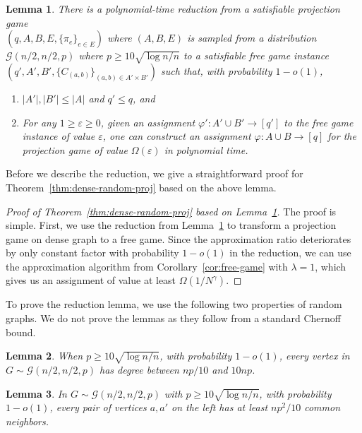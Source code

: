 \documentclass{article}
\newtheorem{lemma}{Lemma}
\begin{document}
\begin{lemma} \label{lem:reduction-dense}
There is a polynomial-time reduction from a satisfiable projection game \\ $(q, A, B, E, \{\pi_e\}_{e \in E})$ where $(A, B, E)$ is sampled from a distribution $\mathcal{G}(n/2, n/2, p)$ where $p \geq 10\sqrt{\log n / n}$ to a satisfiable free game instance $(q', A', B', \{C_{(a, b)}\}_{(a, b) \in A' \times B'})$ such that, with probability $1 - o(1)$,
\begin{enumerate} \itemsep0em
  \item $|A'|, |B'| \leq |A|$ and $q' \leq q$, and
  \item For any $1 \geq \varepsilon \geq 0$, given an assignment $\varphi': A' \cup B' \to [q']$ to the free game instance of value $\varepsilon$, one can construct an assignment $\varphi: A \cup B \to [q]$ for the projection game of value $\Omega(\varepsilon)$ in polynomial time.
\end{enumerate}
\end{lemma}

Before we describe the reduction, we give a straightforward proof for Theorem~\ref{thm:dense-random-proj} based on the above lemma.

\begin{proof}[Proof of Theorem~\ref{thm:dense-random-proj} based on Lemma~\ref{lem:reduction-dense}]
The proof is simple. First, we use the reduction from Lemma~\ref{lem:reduction-dense} to transform a projection game on dense graph to a free game. Since the approximation ratio deteriorates by only constant factor with probability $1 - o(1)$ in the reduction, we can use the approximation algorithm from Corollary~\ref{cor:free-game} with $\lambda = 1$, which gives us an assignment of value at least $\Omega(1/N^\gamma)$.
\end{proof}

To prove the reduction lemma, we use the following two properties of random graphs. We do not prove the lemmas as they follow from a standard Chernoff bound. \\

\begin{lemma} \label{lem:prop-dense-random1}
When $p \geq 10\sqrt{\log n / n}$, with probability $1 - o(1)$, every vertex in $G \sim \mathcal{G}(n/2, n/2, p)$ has degree between $np/10$ and $10np$. \\
\end{lemma}

\begin{lemma} \label{lem:prop-dense-random2}
In $G \sim \mathcal{G}(n/2, n/2, p)$ with $p \geq 10\sqrt{\log n / n}$, with probability $1 - o(1)$, every pair of vertices $a, a'$ on the left has at least $np^2/10$ common neighbors.
\end{lemma}
\end{document}
